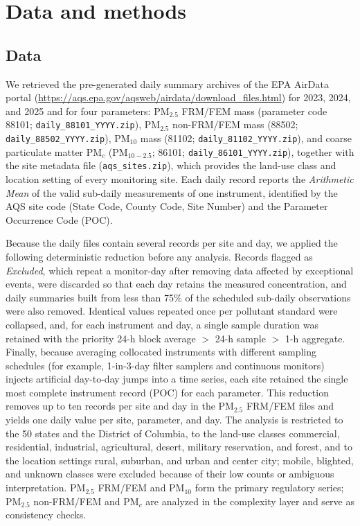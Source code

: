 \documentclass[a4paper,fleqn]{cas-sc}
\begin{document}
\section{Data and methods}\label{sec:data}
\subsection{Data}

We retrieved the pre-generated daily summary archives of the EPA AirData portal (\url{https://aqs.epa.gov/aqsweb/airdata/download_files.html}) for 2023, 2024, and 2025 and for four parameters: PM$_{2.5}$ FRM/FEM mass (parameter code 88101; \texttt{daily\_88101\_YYYY.zip}), PM$_{2.5}$ non-FRM/FEM mass (88502; \texttt{daily\_88502\_YYYY.zip}), PM$_{10}$ mass (81102; \texttt{daily\_81102\_YYYY.zip}), and coarse particulate matter PM$_{c}$ (PM$_{10-2.5}$; 86101; \texttt{daily\_86101\_YYYY.zip}), together with the site metadata file (\texttt{aqs\_sites.zip}), which provides the land-use class and location setting of every monitoring site. Each daily record reports the \textit{Arithmetic Mean} of the valid sub-daily measurements of one instrument, identified by the AQS site code (State Code, County Code, Site Number) and the Parameter Occurrence Code (POC).

Because the daily files contain several records per site and day, we applied the following deterministic reduction before any analysis. Records flagged as \textit{Excluded}, which repeat a monitor-day after removing data affected by exceptional events, were discarded so that each day retains the measured concentration, and daily summaries built from less than 75\% of the scheduled sub-daily observations were also removed. Identical values repeated once per pollutant standard were collapsed, and, for each instrument and day, a single sample duration was retained with the priority 24-h block average $>$ 24-h sample $>$ 1-h aggregate. Finally, because averaging collocated instruments with different sampling schedules (for example, 1-in-3-day filter samplers and continuous monitors) injects artificial day-to-day jumps into a time series, each site retained the single most complete instrument record (POC) for each parameter. This reduction removes up to ten records per site and day in the PM$_{2.5}$ FRM/FEM files and yields one daily value per site, parameter, and day. The analysis is restricted to the 50 states and the District of Columbia, to the land-use classes commercial, residential, industrial, agricultural, desert, military reservation, and forest, and to the location settings rural, suburban, and urban and center city; mobile, blighted, and unknown classes were excluded because of their low counts or ambiguous interpretation. PM$_{2.5}$ FRM/FEM and PM$_{10}$ form the primary regulatory series; PM$_{2.5}$ non-FRM/FEM and PM$_{c}$ are analyzed in the complexity layer and serve as consistency checks.
\end{document}
